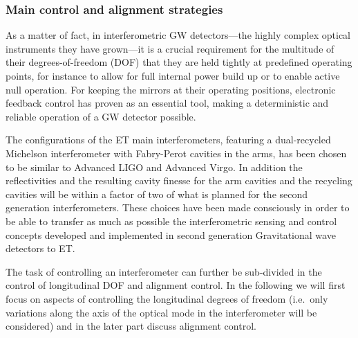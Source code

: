 \FloatBarrier
\subsubsection{Main control and alignment strategies}\label{sec:control}

As a matter of fact, in interferometric GW detectors---the highly complex optical instruments they have grown---it is a crucial requirement 
for the multitude of their degrees-of-freedom (DOF) that they are held tightly at predefined operating points, for instance to allow for full internal power build 
up or to enable active null operation. 
For keeping the mirrors at their operating positions, electronic feedback control has proven as an essential tool, 
making a deterministic and reliable operation 
of a GW detector possible.

{
The configurations of the ET main interferometers, featuring a dual-recycled Michelson interferometer
with Fabry-Perot cavities in the arms, has been chosen to be similar to 
Advanced LIGO and Advanced Virgo.  In addition the reflectivities and the resulting cavity finesse for 
the arm cavities and the recycling cavities will be within a factor of two of what is planned for the second 
generation interferometers. These choices have been made  consciously  in order to be able to transfer
as much as possible the interferometric sensing and control concepts developed and implemented in second generation Gravitational wave detectors
to ET. 
}

The task of controlling an interferometer can further be sub-divided in the control of longitudinal DOF and alignment control.
In the following we will first focus on aspects of controlling the longitudinal degrees of freedom  (i.e.\ only variations along the axis of the optical mode in the interferometer
will be considered) and in the later part discuss alignment control.%
\FloatBarrier
